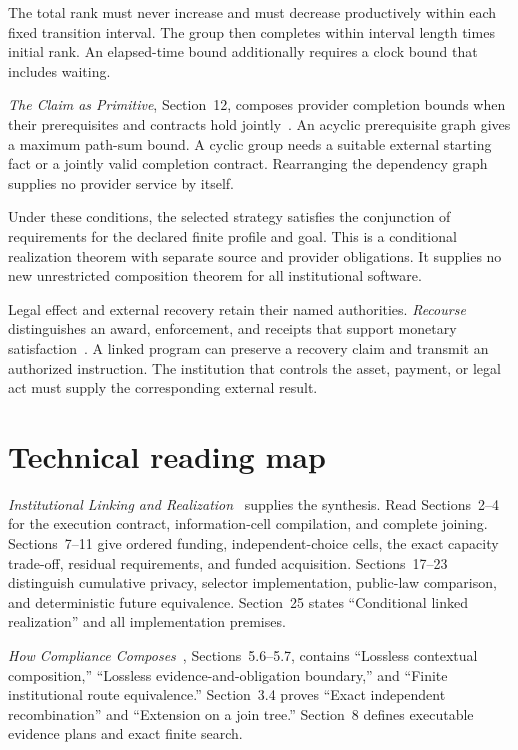 \documentclass{momentum}
\begin{document}
The total rank must never increase and must decrease productively within each fixed transition interval. The group then completes within interval length times initial rank.
An elapsed-time bound additionally requires a clock bound that includes waiting.

\emph{The Claim as Primitive}, Section~12, composes provider completion bounds when their prerequisites and contracts hold jointly~\cite{claim}.
An acyclic prerequisite graph gives a maximum path-sum bound.
A cyclic group needs a suitable external starting fact or a jointly valid completion contract.
Rearranging the dependency graph supplies no provider service by itself.

Under these conditions, the selected strategy satisfies the conjunction of requirements for the declared finite profile and goal.
This is a conditional realization theorem with separate source and provider obligations.
It supplies no new unrestricted composition theorem for all institutional software.

Legal effect and external recovery retain their named authorities.
\emph{Recourse} distinguishes an award, enforcement, and receipts that support monetary satisfaction~\cite{recourse}.
A linked program can preserve a recovery claim and transmit an authorized instruction.
The institution that controls the asset, payment, or legal act must supply the corresponding external result.

\section{Technical reading map}
\label{sec:reading-map}

\emph{Institutional Linking and Realization}~\cite{linking} supplies the synthesis.
Read Sections~2--4 for the execution contract, information-cell compilation, and complete joining.
Sections~7--11 give ordered funding, independent-choice cells, the exact capacity trade-off, residual requirements, and funded acquisition.
Sections~17--23 distinguish cumulative privacy, selector implementation, public-law comparison, and deterministic future equivalence.
Section~25 states ``Conditional linked realization'' and all implementation premises.

\emph{How Compliance Composes}~\cite{compliance}, Sections~5.6--5.7, contains ``Lossless contextual composition,'' ``Lossless evidence-and-obligation boundary,'' and ``Finite institutional route equivalence.''
Section~3.4 proves ``Exact independent recombination'' and ``Extension on a join tree.''
Section~8 defines executable evidence plans and exact finite search.
\end{document}
